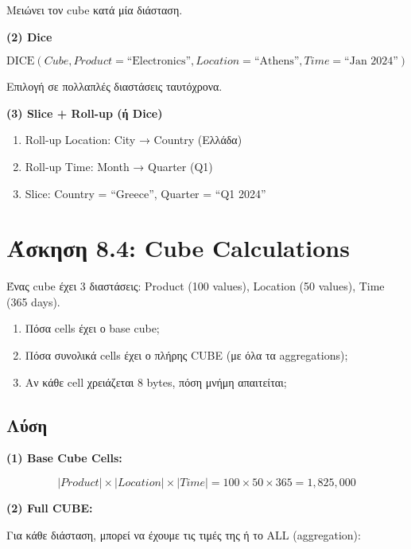 Μειώνει τον cube κατά μία διάσταση.

\textbf{(2) Dice}

$$\text{DICE}(Cube, Product = \text{``Electronics''}, Location = \text{``Athens''}, Time = \text{``Jan 2024''})$$

Επιλογή σε πολλαπλές διαστάσεις ταυτόχρονα.

\textbf{(3) Slice + Roll-up (ή Dice)}

\begin{enumerate}
    \item Roll-up Location: City → Country (Ελλάδα)
    \item Roll-up Time: Month → Quarter (Q1)
    \item Slice: Country = ``Greece'', Quarter = ``Q1 2024''
\end{enumerate}

\section{Άσκηση 8.4: Cube Calculations}

\begin{formulabox}[Εκφώνηση]
Ένας cube έχει 3 διαστάσεις: Product (100 values), Location (50 values),
Time (365 days).

\begin{enumerate}
    \item Πόσα cells έχει ο base cube;
    \item Πόσα συνολικά cells έχει ο πλήρης CUBE (με όλα τα aggregations);
    \item Αν κάθε cell χρειάζεται 8 bytes, πόση μνήμη απαιτείται;
\end{enumerate}
\end{formulabox}

\subsection*{Λύση}

\textbf{(1) Base Cube Cells:}

$$|Product| \times |Location| \times |Time| = 100 \times 50 \times 365 = 1,825,000$$

\textbf{(2) Full CUBE:}

Για κάθε διάσταση, μπορεί να έχουμε τις τιμές της ή το ALL (aggregation):

